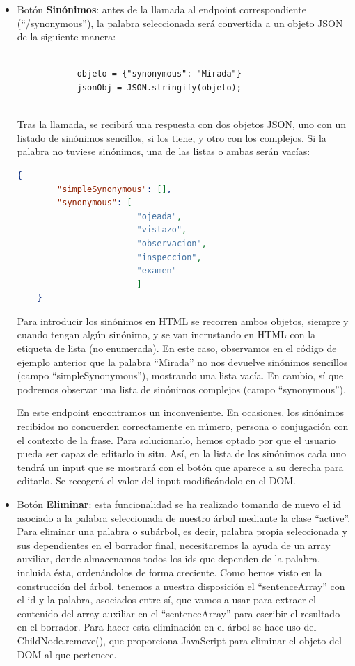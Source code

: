 \begin{itemize}
	\item Botón \textbf{Sinónimos}: antes de la llamada al endpoint correspondiente (``/synonymous''), la palabra seleccionada será convertida a un objeto JSON de la siguiente manera:
	\begin{lstlisting}
	       
	        objeto = {"synonymous": "Mirada"}
	        jsonObj = JSON.stringify(objeto);
	
	\end{lstlisting}
	Tras la llamada, se recibirá una respuesta con dos objetos JSON, uno con un listado de sinónimos sencillos, si los tiene, y otro con los complejos. Si la palabra no tuviese sinónimos, una de las listas o ambas serán vacías:
		\begin{lstlisting}[language=json,firstnumber=1]
		{
		"simpleSynonymous": [],
		"synonymous": [
						"ojeada",
						"vistazo",
						"observacion",
						"inspeccion",
						"examen"
						]
	}
	\end{lstlisting}
	


	Para introducir los sinónimos en HTML se recorren ambos objetos, siempre y cuando tengan algún sinónimo, y se van incrustando en HTML con la etiqueta de lista (no enumerada). En este caso, observamos en el código de ejemplo anterior que la palabra ``Mirada'' no nos devuelve sinónimos sencillos (campo ``simpleSynonymous''), mostrando una lista vacía. En cambio, sí que podremos observar una lista de sinónimos complejos (campo ``synonymous'').
	
	En este endpoint encontramos un inconveniente. En ocasiones, los sinónimos recibidos no concuerden correctamente en número, persona o conjugación con el contexto de la frase. Para solucionarlo, hemos optado por que el usuario pueda ser capaz de editarlo in situ. Así, en la lista de los sinónimos cada uno tendrá un input que se mostrará con el botón que aparece a su derecha para editarlo. Se recogerá el valor del input modificándolo en el DOM.
	

	\item Botón \textbf{Eliminar}: esta funcionalidad se ha realizado tomando de nuevo el id asociado a la palabra seleccionada de nuestro árbol mediante la clase ``active''. Para eliminar una palabra o subárbol, es decir, palabra propia seleccionada y sus dependientes en el borrador final, necesitaremos la ayuda de un array auxiliar, donde almacenamos todos los ids que dependen de la palabra, incluida ésta, ordenándolos de forma creciente. Como hemos visto en la construcción del árbol, tenemos a nuestra disposición el ``sentenceArray'' con el id y la palabra, asociados entre sí, que vamos a usar para extraer el contenido del array auxiliar en el ``sentenceArray''  para escribir el resultado en el borrador. Para hacer esta eliminación en el árbol se hace uso del ChildNode.remove(), que proporciona JavaScript para eliminar el objeto del DOM al que pertenece.





\end{itemize}
